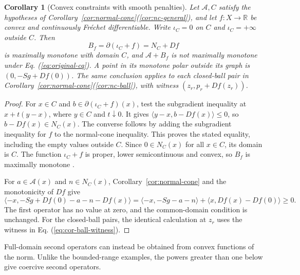\documentclass[11pt]{article}
\newcommand{\R}{\mathbb R}
\newcommand{\pair}[2]{\langle #1,#2\rangle}
\newtheorem{corollary}{Corollary}
\theoremstyle{definition}
\theoremstyle{remark}
\begin{document}
\begin{corollary}[Convex constraints with smooth penalties]
\label{cor:constrained-penalties}
Let $\mathcal A,C$ satisfy the hypotheses of Corollary~\ref{cor:normal-cone}\textup{(\ref{cor:nc-general})}, and let $f:X\to\R$ be convex and continuously Fr\'{e}chet differentiable. Write $\iota_C=0$ on $C$ and $\iota_C=+\infty$ outside $C$. Then
\[
B_f=\partial(\iota_C+f)=N_C+Df
\]
is maximally monotone with domain $C$, and $\mathcal A+B_f$ is not maximally monotone under Eq. (\ref{eq:original-cq}). A point in its monotone polar outside its graph is $(0,-Sg+Df(0))$. The same conclusion applies to each closed-ball pair in Corollary~\ref{cor:normal-cone}\textup{(\ref{cor:nc-ball})}, with witness $(z_r,p_r+Df(z_r))$.
\end{corollary}
\begin{proof}
For $x\in C$ and $b\in\partial(\iota_C+f)(x)$, test the subgradient inequality at $x+t(y-x)$, where $y\in C$ and $t\downarrow0$. It gives $\pair{y-x}{b-Df(x)}\le0$, so $b-Df(x)\in N_C(x)$. The converse follows by adding the subgradient inequality for $f$ to the normal-cone inequality. This proves the stated equality, including the empty values outside $C$. Since $0\in N_C(x)$ for all $x\in C$, its domain is $C$. The function $\iota_C+f$ is proper, lower semicontinuous and convex, so $B_f$ is maximally monotone \cite{rockafellar1970subdiff}.

For $a\in\mathcal A(x)$ and $n\in N_C(x)$, Corollary~\ref{cor:normal-cone} and the monotonicity of $Df$ give
\[
\pair{-x}{-Sg+Df(0)-a-n-Df(x)}
=\pair{-x}{-Sg-a-n}+\pair{x}{Df(x)-Df(0)}\ge0.
\]
The first operator has no value at zero, and the common-domain condition is unchanged. For the closed-ball pairs, the identical calculation at $z_r$ uses the witness in Eq. (\ref{eq:cor-ball-witness}).
\end{proof}

Full-domain second operators can instead be obtained from convex functions of the norm. Unlike the bounded-range examples, the powers greater than one below give coercive second operators.
\end{document}
